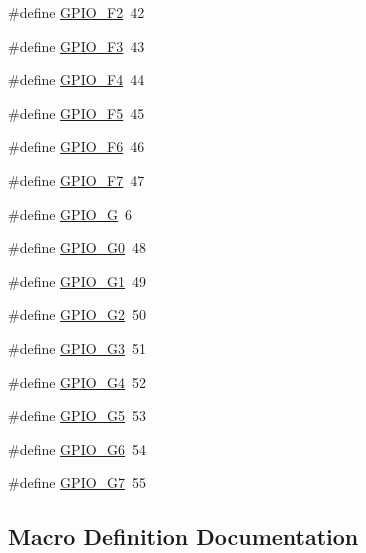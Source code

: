 \begin{DoxyCompactItemize}
\item 
\#define \hyperlink{gpio-1284p_8h_a0094393cbf637cfe7d40dced82c771ea}{G\+P\+I\+O\+\_\+\+F2}~42
\item 
\#define \hyperlink{gpio-1284p_8h_ab86a587f8491bca6bb231a144eaf7fd1}{G\+P\+I\+O\+\_\+\+F3}~43
\item 
\#define \hyperlink{gpio-1284p_8h_aa47ac3459655ee291dd65c811bc6b99e}{G\+P\+I\+O\+\_\+\+F4}~44
\item 
\#define \hyperlink{gpio-1284p_8h_a3d898ce400e1a8e76900e99728aae96d}{G\+P\+I\+O\+\_\+\+F5}~45
\item 
\#define \hyperlink{gpio-1284p_8h_a643511e93dba3ea54cf325ad451535e2}{G\+P\+I\+O\+\_\+\+F6}~46
\item 
\#define \hyperlink{gpio-1284p_8h_a82c6ae049db926014fd52719c0d02192}{G\+P\+I\+O\+\_\+\+F7}~47
\item 
\#define \hyperlink{gpio-1284p_8h_af895d3c70be50511282ce02f5237769f}{G\+P\+I\+O\+\_\+G}~6
\item 
\#define \hyperlink{gpio-1284p_8h_a9d5a4c0ff8ab0eca6bdbd469643ac937}{G\+P\+I\+O\+\_\+\+G0}~48
\item 
\#define \hyperlink{gpio-1284p_8h_abe8e5b5e2fe915cd646b7aa0a72688dc}{G\+P\+I\+O\+\_\+\+G1}~49
\item 
\#define \hyperlink{gpio-1284p_8h_acf7857b47e32cbba1990cf205059fa51}{G\+P\+I\+O\+\_\+\+G2}~50
\item 
\#define \hyperlink{gpio-1284p_8h_a3ba0c1013fbfbbcf63e65836d3142472}{G\+P\+I\+O\+\_\+\+G3}~51
\item 
\#define \hyperlink{gpio-1284p_8h_a176ab75f9b3a6679378e5cda55a5ca8c}{G\+P\+I\+O\+\_\+\+G4}~52
\item 
\#define \hyperlink{gpio-1284p_8h_a4968768b005a95503e7b5be64b083960}{G\+P\+I\+O\+\_\+\+G5}~53
\item 
\#define \hyperlink{gpio-1284p_8h_ae1ce3e6417e9ade2476c05aec73f423f}{G\+P\+I\+O\+\_\+\+G6}~54
\item 
\#define \hyperlink{gpio-1284p_8h_ae7679ecd9497c45e348093a909807ded}{G\+P\+I\+O\+\_\+\+G7}~55
\end{DoxyCompactItemize}


\subsection{Macro Definition Documentation}
\mbox{\label{gpio-1284p_8h_a0c234917347c5bfd7cea239572a370d7}} 
